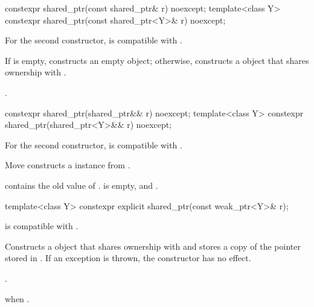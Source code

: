 %
\begin{itemdecl}
constexpr shared_ptr(const shared_ptr& r) noexcept;
template<class Y> constexpr shared_ptr(const shared_ptr<Y>& r) noexcept;
\end{itemdecl}

\begin{itemdescr}
\pnum
\constraints
For the second constructor,  is compatible with .

\pnum
\effects
If  is empty, constructs
an empty  object; otherwise, constructs
a  object that shares ownership with .

\pnum
\ensures
{}.
\end{itemdescr}

%
\begin{itemdecl}
constexpr shared_ptr(shared_ptr&& r) noexcept;
template<class Y> constexpr shared_ptr(shared_ptr<Y>&& r) noexcept;
\end{itemdecl}

\begin{itemdescr}
\pnum
\constraints
For the second constructor,  is compatible with .

\pnum
\effects
Move constructs a  instance from .

\pnum
\ensures
{} contains the old value of
.  is empty, and .
\end{itemdescr}

%
%
\begin{itemdecl}
template<class Y> constexpr explicit shared_ptr(const weak_ptr<Y>& r);
\end{itemdecl}

\begin{itemdescr}
\pnum
\constraints
{} is compatible with .

\pnum
\effects
Constructs a  object that shares ownership with
 and stores a copy of the pointer stored in .
If an exception is thrown, the constructor has no effect.

\pnum
\ensures
{}.

\pnum
\throws
{} when .
\end{itemdescr}

